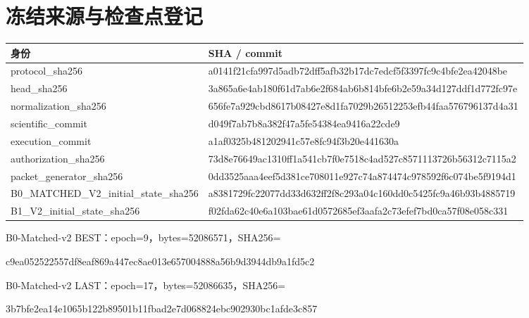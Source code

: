 \documentclass[UTF8,a4paper,11pt,fontset=windows]{ctexart}
\begin{document}
\section{冻结来源与检查点登记}
\begin{longtable}{p{36mm}p{116mm}}\toprule 身份 & SHA / commit\\\midrule\endhead
protocol\_sha256 & {\footnotesize\ttfamily a0141f21cfa997d5adb72dff5afb32b17dc7edcf5f3397fc9c4bfe2ea42048be}\\
head\_sha256 & {\footnotesize\ttfamily 3a865a6e4ab180f61d7ab6e2f684ab6b814bfe6b2e59a34d127ddf1d772fc97e}\\
normalization\_sha256 & {\footnotesize\ttfamily 656fe7a929cbd8617b08427e8d1fa7029b26512253efb44faa576796137d4a31}\\
scientific\_commit & {\footnotesize\ttfamily d049f7ab7b8a382f47a5fe54384ea9416a22cde9}\\
execution\_commit & {\footnotesize\ttfamily a1af0325b481202941c57e8fc94f3b20e441630a}\\
authorization\_sha256 & {\footnotesize\ttfamily 73d8e76649ac1310ff1a541cb7f0e7518c4ad527c8571113726b56312c7115a2}\\
packet\_generator\_sha256 & {\footnotesize\ttfamily 0dd3525aaa4eef5d381ce708011e927c74a874474c978592f6c074be5f9194d1}\\
B0\_MATCHED\_V2\_initial\_state\_sha256 & {\footnotesize\ttfamily a8381729fc22077dd33d632ff2f8c293a04c160dd0c5425fc9a46b93b4885719}\\
B1\_V2\_initial\_state\_sha256 & {\footnotesize\ttfamily f02fda62c40e6a103bae61d0572685ef3aafa2c73efef7bd0ca57f08e058c331}\\
\bottomrule\end{longtable}
B0-Matched-v2 BEST：epoch=9，bytes=52086571，SHA256=\par
{\footnotesize\ttfamily c9ea052522557df8eaf869a447ec8ae013e657004888a56b9d3944db9a1fd5c2}\par
{\footnotesize{}}\par
B0-Matched-v2 LAST：epoch=17，bytes=52086635，SHA256=\par
{\footnotesize\ttfamily 3b7bfe2ea14e1065b122b89501b11fbad2e7d068824ebc902930bc1afde3c857}\par
{\footnotesize{}}\par
\end{document}
